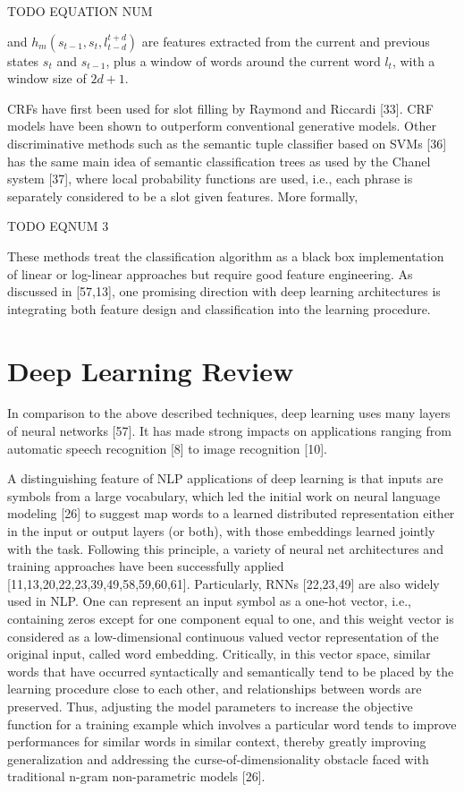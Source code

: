 TODO EQUATION NUM%

and $h_m (s_{t-1},s_t,l_{t-d}^{t+d})$ are features extracted from the current and
previous states $s_t$ and $s_{t-1}$, plus a window of words around the current word
$l_t$, with a window size of $2d+1$.

CRFs have first been used for slot filling by Raymond and Riccardi [33]. CRF
models have been shown to outperform conventional generative models. Other
discriminative methods such as the semantic tuple classifier based on SVMs [36]
has the same main idea of semantic classification trees as used by the Chanel
system [37], where local probability functions are used, i.e., each phrase is
separately considered to be a slot given features. More formally,

TODO EQNUM 3 %

These methods treat the classification algorithm as a black box implementation
of linear or log-linear approaches but require good feature engineering. As
discussed in [57,13], one promising direction with deep learning architectures
is integrating both feature design and classification into the learning
procedure.

\section{Deep Learning Review}
\label{sec:deepreview}

In comparison to the above described techniques, deep learning uses many layers
of neural networks [57]. It has made strong impacts on applications ranging
from automatic speech recognition [8] to image recognition [10]. 

A distinguishing feature of NLP applications of deep learning is that inputs
are symbols from a large vocabulary, which led the initial work on neural
language modeling [26] to suggest map words to a learned distributed
representation either in the input or output layers (or both), with those
embeddings learned jointly with the task. Following this principle, a variety
of neural net architectures and training approaches have been successfully
applied [11,13,20,22,23,39,49,58,59,60,61]. Particularly, RNNs [22,23,49] are
also widely used in NLP. One can represent an input symbol as a one-hot vector,
i.e., containing zeros except for one component equal to one, and this weight
vector is considered as a low-dimensional continuous valued vector
representation of the original input, called word embedding. Critically, in
this vector space, similar words that have occurred syntactically and
semantically tend to be placed by the learning procedure close to each other,
and relationships between words are preserved. Thus, adjusting the model
parameters to increase the objective function for a training example which
involves a particular word tends to improve performances for similar words in
similar context, thereby greatly improving generalization and addressing the
curse-of-dimensionality obstacle faced with traditional n-gram non-parametric
models [26].

